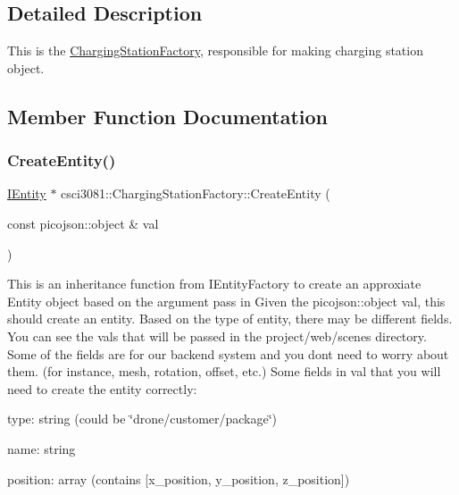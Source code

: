 \subsection{Detailed Description}
This is the \hyperlink{classcsci3081_1_1ChargingStationFactory}{Charging\+Station\+Factory}, responsible for making charging station object. 

\subsection{Member Function Documentation}
\mbox{\label{classcsci3081_1_1ChargingStationFactory_ad7099c9c36583ea8f608cef89200c8e9}} 
\subsubsection{\texorpdfstring{Create\+Entity()}{CreateEntity()}}
{\footnotesize\ttfamily \hyperlink{classentity__project_1_1IEntity}{I\+Entity} $\ast$ csci3081\+::\+Charging\+Station\+Factory\+::\+Create\+Entity (\begin{DoxyParamCaption}\item[{const picojson\+::object \&}]{val }\end{DoxyParamCaption})\hspace{0.3cm}{\ttfamily [virtual]}}



This is an inheritance function from I\+Entity\+Factory to create an approxiate Entity object based on the argument pass in Given the picojson\+::object val, this should create an entity. Based on the type of entity, there may be different fields. You can see the vals that will be passed in the project/web/scenes directory. Some of the fields are for our backend system and you don\textquotesingle{}t need to worry about them. (for instance, mesh, rotation, offset, etc.) Some fields in val that you will need to create the entity correctly\+: 

type\+: string (could be \char`\"{}drone/customer/package\char`\"{})

name\+: string

position\+: array (contains \mbox{[}x\+\_\+position, y\+\_\+position, z\+\_\+position\mbox{]})

